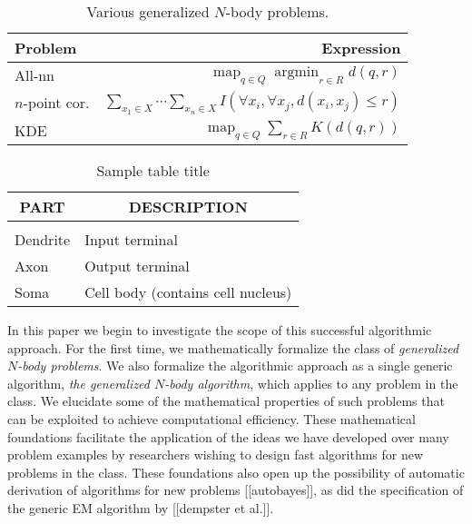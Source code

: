 \documentclass{article}
\DeclareMathOperator*{\argmin}{argmin}
\DeclareMathOperator*{\map}{map}
\begin{document}
\begin{table}[t]
\caption{Various generalized $N$-body problems.}
\label{tab:probs}
\vskip 0.15in
\begin{center}
\begin{small}
\begin{sc}
\begin{tabular}{lr}
\hline
Problem & Expression \\
\hline
All-nn & $\displaystyle \map_{q \in Q} \argmin_{r \in R} d(q,r)$ \\
$n$-point cor. & $\displaystyle \sum_{x_1 \in X} \cdots \sum_{x_n \in X} I(\forall x_i, \forall x_j, d(x_i,x_j) \leq r)$ \\
KDE & $\displaystyle \map_{q \in Q} \sum_{r \in R} K(d(q,r))$ \\
\hline
\end{tabular}
\end{sc}
\end{small}
\end{center}
\vskip -0.1in
\end{table}

\begin{table}[t]
\caption{Sample table title}
\label{sample-table}
\begin{center}
\begin{tabular}{ll}
\multicolumn{1}{c}{\bf PART}  &\multicolumn{1}{c}{\bf DESCRIPTION}
\\ \hline \\
Dendrite         &Input terminal \\
Axon             &Output terminal \\
Soma             &Cell body (contains cell nucleus) \\
\end{tabular}
\end{center}
\end{table}

In this paper we begin to investigate the scope of this successful
algorithmic approach.  For the first time, we mathematically formalize
the class of {\em generalized $N$-body problems}.  We also formalize
the algorithmic approach as a single generic algorithm, {\em the
generalized $N$-body algorithm}, which applies to any problem in the
class.  We elucidate some of the mathematical properties of such
problems that can be exploited to achieve computational efficiency.
These mathematical foundations facilitate the application of the ideas
we have developed over many problem examples by researchers wishing to
design fast algorithms for new problems in the class.  These
foundations also open up the possibility of automatic derivation of
algorithms for new problems [[autobayes]], as did the specification of
the generic EM algorithm by [[dempster et al.]].
\end{document}
